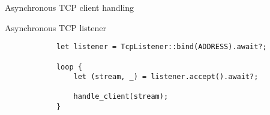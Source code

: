 \begin{frame}[fragile]{Asynchronous TCP client handling}
    \begin{block}{Asynchronous TCP listener}
        \begin{verbatim}
            let listener = TcpListener::bind(ADDRESS).await?;

            loop {
                let (stream, _) = listener.accept().await?;

                handle_client(stream);
            }
        \end{verbatim}
    \end{block}
\end{frame}
